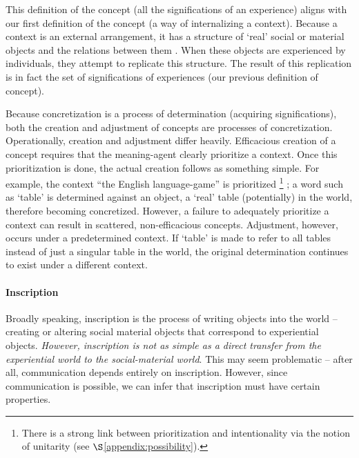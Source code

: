This definition of the concept (all the significations of an experience) aligns with our first definition of the concept (a way of internalizing a context).
Because a context is an external arrangement, it has a structure of `real' social or material objects and the relations between them \citep{Millikan:BeyondConcepts}. When these objects are experienced by individuals, they attempt to replicate this structure. The result of this replication is in fact the set of significations of experiences (our previous definition of concept).

Because concretization is a process of determination (acquiring significations), both the creation and adjustment of concepts are processes of concretization. Operationally, creation and adjustment differ heavily. Efficacious creation of a concept requires that the meaning-agent clearly prioritize a context. Once this prioritization is done, the actual creation follows as something simple. For example, the context ``the English language-game'' is prioritized
\footnote{There is a strong link between prioritization and intentionality via the notion of unitarity (see $\S$\ref{appendix:possibility}). 
}
; a word such as `table' is determined against an object, a `real' table (potentially) in the world, therefore becoming concretized.
However, a failure to adequately prioritize a context can result in scattered, non-efficacious concepts.
Adjustment, however, occurs under a predetermined context. If `table' is made to refer to all tables instead of just a singular table in the world, the original determination continues to exist under a different context.

\paragraph{Inscription}
Broadly speaking, inscription is the process of writing objects into the world -- creating or altering social material objects that correspond to experiential objects. \textit{However, inscription is not as simple as a direct transfer from the experiential world to the social-material world}. This may seem problematic -- after all, communication depends entirely on inscription. However, since communication is possible, we can infer that inscription must have certain properties.

